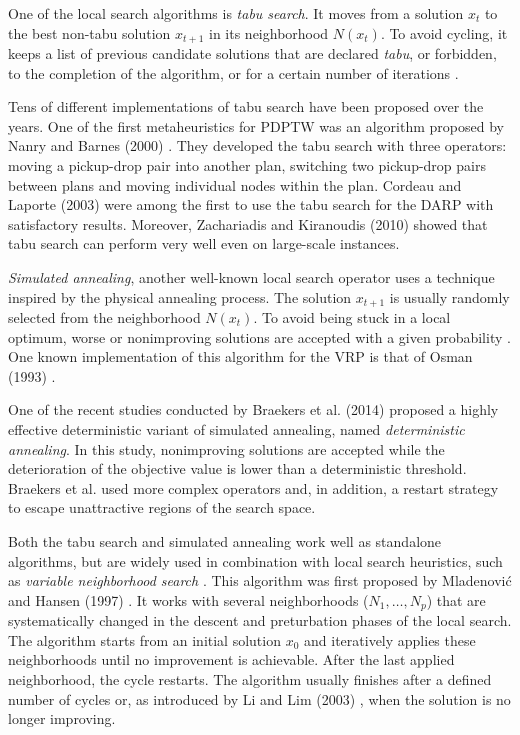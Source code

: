 
One of the local search algorithms is \emph{tabu search}. It moves from a solution $x_t$ to the best non-tabu solution $x_{t+1}$ in its neighborhood $N(x_t)$. To avoid cycling, it keeps a list of previous candidate solutions that are declared \emph{tabu}, or forbidden, to the completion of the algorithm, or for a certain number of iterations \cite{toth2015vrp}.

Tens of different implementations of tabu search have been proposed over the years. One of the first metaheuristics for PDPTW was an algorithm proposed by Nanry and Barnes (2000) \cite{nanryBarnes}. They developed the tabu search with three operators: moving a pickup-drop pair into another plan, switching two pickup-drop pairs between plans and moving individual nodes within the plan. Cordeau and Laporte (2003) \cite{Cordeau2003} were among the first to use the tabu search for the DARP with satisfactory results. Moreover, Zachariadis and Kiranoudis (2010) \cite{Zachariadis2010} showed that tabu search can perform very well even on large-scale instances.


\emph{Simulated annealing}, another well-known local search operator uses a technique inspired by the physical annealing process. The solution $x_{t+1}$ is usually randomly selected from the neighborhood $N(x_t)$. To avoid being stuck in a local optimum, worse or nonimproving solutions are accepted with a given probability \cite{Bono2020}. One known implementation of this algorithm for the VRP is that of Osman (1993) \cite{Osman1993}.

One of the recent studies conducted by Braekers et al. (2014) \cite{Braekers2014} proposed a highly effective deterministic variant of simulated annealing, named \emph{deterministic annealing}. In this study, nonimproving solutions are accepted while the deterioration of the objective value is lower than a deterministic threshold. Braekers et al. used more complex operators and, in addition, a restart strategy to escape unattractive regions of the search space.


Both the tabu search and simulated annealing work well as standalone algorithms, but are widely used in combination with local search heuristics, such as \emph{variable neighborhood search} \cite{Gendreau2001, Schneider2014}. This algorithm was first proposed by Mladenovi{\' c} and Hansen (1997) \cite{Mladenovic1997}. It works with several neighborhoods ($N_1,\ldots,N_p$) that are systematically changed in the descent and preturbation phases of the local search. The algorithm starts from an initial solution $x_0$ and iteratively applies these neighborhoods until no improvement is achievable. After the last applied neighborhood, the cycle restarts. The algorithm usually finishes after a defined number of cycles or, as introduced by Li and Lim (2003) \cite{liLim}, when the solution is no longer improving.

